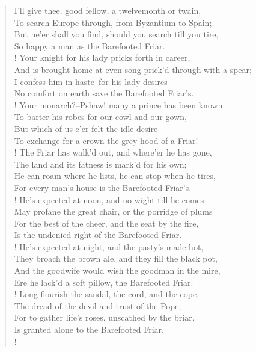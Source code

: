 \begin{verse}

I'll give thee, good fellow, a twelvemonth or twain,\\
To search Europe through, from Byzantium to Spain;\\
But ne'er shall you find, should you search till you tire,\\
So happy a man as the Barefooted Friar.\\!
Your knight for his lady pricks forth in career,\\
And is brought home at even-song prick'd through with a spear;\\
I confess him in haste--for his lady desires\\
No comfort on earth save the Barefooted Friar's.\\!
Your monarch?--Pshaw! many a prince has been known\\
To barter his robes for our cowl and our gown,\\
But which of us e'er felt the idle desire\\
To exchange for a crown the grey hood of a Friar!\\!
The Friar has walk'd out, and where'er he has gone,\\
The land and its fatness is mark'd for his own;\\
He can roam where he lists, he can stop when he tires,\\
For every man's house is the Barefooted Friar's.\\!
He's expected at noon, and no wight till he comes\\
May profane the great chair, or the porridge of plums\\
For the best of the cheer, and the seat by the fire,\\
Is the undenied right of the Barefooted Friar.\\!
He's expected at night, and the pasty's made hot,\\
They broach the brown ale, and they fill the black pot,\\
And the goodwife would wish the goodman in the mire,\\
Ere he lack'd a soft pillow, the Barefooted Friar.\\!
Long flourish the sandal, the cord, and the cope,\\
The dread of the devil and trust of the Pope;\\
For to gather life's roses, unscathed by the briar,\\
Is granted alone to the Barefooted Friar.\\!
\end{verse}

